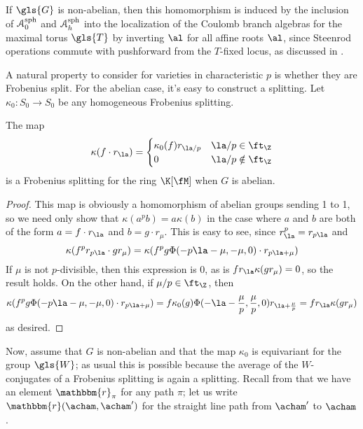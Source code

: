 If $\gls{G}$ is non-abelian, then this homomorphism is induced by the
inclusion of $\EuScript{A}_0^{\operatorname{sph}}$ and $\EuScript{A}_h^{\operatorname{sph}}$ into the
localization of the Coulomb branch algebras for the maximal torus $\gls{T}$ by inverting $\al$ for all affine
roots $\al$, since Steenrod operations commute with pushforward from the $T$-fixed locus, as discussed in \cite[\S 3.15(4)]{Lon}.



A natural property to consider for varieties in characteristic $p$ is whether they are Frobenius split.  For the abelian case, it's easy to construct a splitting.  Let $\kappa_0\colon S_0\to S_0$ be any homogeneous Frobenius splitting.
\begin{proposition}\label{prop:abelian-splitting}
  The map
  \[\kappa(f\cdot r_\la)=
    \begin{cases}
      \kappa_0(f) r_{\la/p} & \la/p\in \ft_\Z\\
      0 & \la/p\notin \ft_\Z
    \end{cases}\]
  is a Frobenius splitting for the ring $\K[\fM]$ when $G$ is abelian.
\end{proposition}
\begin{proof}
  This map is obviously a homomorphism of abelian groups sending 1 to 1, so we need only show that $\kappa(a^pb)=a\kappa(b)$ in the case where $a$ and $b$ are both of the form $a=f\cdot r_\la$ and $b=g\cdot r_\mu$.  This is easy to see, since $r_\la^p=r_{p\la}$ and 
  \[\kappa(f^p r_{p\la}\cdot g r_\mu )=\kappa(f^pg \Phi(-p\la-\mu,-\mu,0)\cdot r_{p\la+\mu})\]
  If $\mu$ is not $p$-divisible, then this expression is 0, as is $fr_\la\kappa(gr_\mu)=0$, so the result holds.  On the other hand, if $\mu/p\in \ft_\Z$, then
  \[\kappa(f^pg \Phi(-p\la-\mu,-\mu,0)\cdot r_{p\la+\mu})=f\kappa_0(g) \Phi(-\la-\frac{\mu}{p},\frac{\mu}{p},0)r_{\la+\frac{\mu}{p}}=fr_{\la}\kappa(g r_\mu )\] as desired.  
\end{proof}

Now, assume that $G$ is non-abelian and that the map $\kappa_0$ is equivariant for the group $\gls{W}$; as usual this is possible because the average of the $W$-conjugates of a Frobenius splitting is again a splitting.  Recall from \cite[Def. 3.11]{WebSD} that we have an element $\mathbbm{r}_\pi$ for any path $\pi$; let us write $\mathbbm{r}(\acham,\acham')$ for the straight line path from $\acham'$ to $\acham$.

